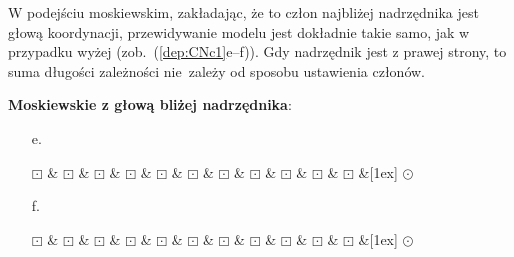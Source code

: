 \documentclass[licencjacka]{pracamgr_Kogni}
\begin{document}
    W podejściu moskiewskim, zakładając, że to człon najbliżej nadrzędnika jest głową koordynacji, przewidywanie modelu jest dokładnie takie samo, jak w przypadku wyżej (zob.~(\ref{dep:CNc1}e--f)). Gdy nadrzędnik jest z prawej strony, to suma długości zależności nie~zależy od sposobu ustawienia członów.
    \begin{exe}
        \item\label{dep:CNc} \textbf{Moskiewskie z głową bliżej nadrzędnika}:
        \begin{enumerate}[label=\alph{enumi}. , ref=\alph{enumi}]
            \item[e. ]
            \begin{dependency}[baseline=-3pt, hide label, edge height=.5em]
                \begin{deptext}[column sep=.1ex]
                    $\boxdot$ \& $\boxdot$ \& $\boxdot$ \& $\boxdot$ \& $\boxdot$ \& $\boxdot$ \& $\boxdot$ \& $\boxdot$ \& $\boxdot$ \& $\boxdot$ \& $\boxdot$ \&[1ex] $\odot$ \\
                \end{deptext}
            \end{dependency}
            \label{dep:CNc1}
            \item[f. ]
            \begin{dependency}[baseline=-3pt, hide label, edge height=.5em]
                \begin{deptext}[column sep=.1ex]
                    $\boxdot$ \& $\boxdot$ \& $\boxdot$ \& $\boxdot$ \& $\boxdot$ \& $\boxdot$ \& $\boxdot$ \& $\boxdot$ \& $\boxdot$ \& $\boxdot$ \& $\boxdot$ \&[1ex] $\odot$ \\
                \end{deptext}
            \end{dependency}
            \label{dep:CNc2}
        \end{enumerate}
    \end{exe}
\end{document}
